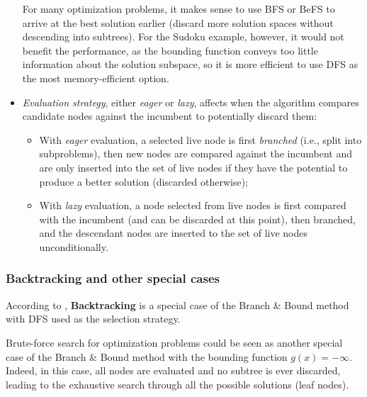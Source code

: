 \begin{itemize}
        For many optimization problems, it makes sense to use BFS or BeFS to arrive at the best
        solution earlier (discard more solution spaces without descending into subtrees).
        For the Sudoku example, however, it would not benefit the performance, as the bounding
        function conveys too little information about the solution subspace, so it is more efficient
        to use DFS as the most memory-efficient option.

    \item \emph{Evaluation strategy}, either \emph{eager} or \emph{lazy}, affects when the
        algorithm compares candidate nodes against the incumbent to potentially discard them:
        \begin{itemize}
            \item With \emph{eager} evaluation, a selected live node is first \emph{branched}
                (i.e., split into subproblems), then
                new nodes are compared against the incumbent and are only inserted into the set
                of live nodes if they have the potential to produce a better solution
                (discarded otherwise);
            \item With \emph{lazy} evaluation, a node selected from live nodes is first compared
                with the incumbent (and can be discarded at this point), then branched,
                and the descendant nodes are inserted to the set of live nodes unconditionally.
        \end{itemize}
\end{itemize}

\subsubsection{Backtracking and other special cases}

According to \cite{clausen1999principles}, \textbf{Backtracking} is a special case of the
Branch \& Bound method with DFS used as the selection strategy.

Brute-force search for optimization problems could be seen as another special case of the
Branch \& Bound method with the bounding function $g(x) = -\infty$.
Indeed, in this case, all nodes are evaluated
and no subtree is ever discarded, leading to the exhaustive search through all the possible solutions
(leaf nodes).

